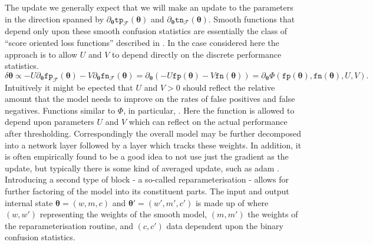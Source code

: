 \documentclass[10pt,a4paper]{article}
\begin{document}
The update we generally expect that we will make an update to the parameters in the direction spanned by $\partial_{\boldsymbol\theta}\texttt{tp}_{\mathcal F}(\boldsymbol\theta)$ and $\partial_{\boldsymbol\theta}\texttt{tn}_{\mathcal F}(\boldsymbol\theta)$.
Smooth functions that depend only upon these smooth confusion statistics are essentially the class of ``score oriented loss functions'' described in \cite{marchetti2022score}.
In the case considered here the approach is to allow $U$ and $V$ to depend directly on the discrete performance statistics.
$$
\delta\boldsymbol\theta\propto-U\partial_{\boldsymbol\theta}\texttt{fp}_{\mathcal F}(\boldsymbol\theta)-V\partial_{\boldsymbol\theta}\texttt{fn}_{\mathcal F}(\boldsymbol\theta)=\partial_{\boldsymbol\theta}(-U\texttt{fp}(\boldsymbol\theta)-V\texttt{fn}(\boldsymbol\theta))=\partial_{\boldsymbol\theta}\Phi(\texttt{fp}(\boldsymbol\theta),\texttt{fn}(\boldsymbol\theta),U,V).
$$
Intuitively it might be epected that $U$ and $V>0$ should reflect the relative amount that the model needs to improve on the rates of false positives and false negatives.
Functions similar to $\Phi$, in particular, .
Here the function is allowed to depend upon parameters $U$ and $V$ which can reflect on the actual performance after thresholding.
Correspondingly the overall model may be further decomposed into a network layer followed by a layer which tracks these weights.
In addition, it is often empirically found to be a good idea to not use just the gradient as the update, but typically there is some kind of averaged update, such as adam \cite{kingma2017adammethodstochasticoptimization}.
Introducing a second type of block - a so-called reparameterisation - allows for further factoring of the model into its constituent parts.
The input and output internal state $\boldsymbol\theta=(w,m,c)$ and $\boldsymbol\theta'=(w',m',c')$ is made up of where $(w,w')$ representing the weights of the smooth model, $(m,m')$ the weights of the reparameterisation routine, and $(c,c')$ data dependent upon the binary confusion statistics.
\end{document}
